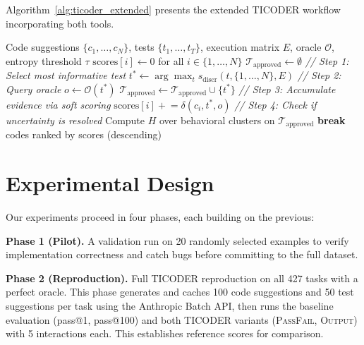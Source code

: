 \documentclass[conference]{IEEEtran}
\begin{document}
Algorithm~\ref{alg:ticoder_extended} presents the extended TICODER workflow incorporating both tools.

\begin{algorithm}[t]
\caption{Extended TICODER: Soft Scoring with Entropy-Based Early Stopping}
\label{alg:ticoder_extended}
\begin{algorithmic}[1]
\Require Code suggestions $\{c_1, \ldots, c_N\}$, tests $\{t_1, \ldots, t_T\}$, execution matrix $E$, oracle $\mathcal{O}$, entropy threshold $\tau$
\State $\text{scores}[i] \gets 0$ for all $i \in \{1, \ldots, N\}$
\State $\mathcal{T}_{\text{approved}} \gets \emptyset$
    \State \textit{// Step 1: Select most informative test}
    \State $t^* \gets \arg\max_{t} s_{\text{discr}}(t, \{1,\ldots,N\}, E)$
    \State \textit{// Step 2: Query oracle}
    \State $o \gets \mathcal{O}(t^*)$
        \State $\mathcal{T}_{\text{approved}} \gets \mathcal{T}_{\text{approved}} \cup \{t^*\}$
    \EndIf
    \State \textit{// Step 3: Accumulate evidence via soft scoring}
        \State $\text{scores}[i] \mathrel{+}= \delta(c_i, t^*, o)$
    \EndFor
    \State \textit{// Step 4: Check if uncertainty is resolved}
    \State Compute $H$ over behavioral clusters on $\mathcal{T}_{\text{approved}}$
        \State \textbf{break} 
    \EndIf
\EndFor
\State \Return codes ranked by scores (descending)
\end{algorithmic}
\end{algorithm}

\section{Experimental Design}

Our experiments proceed in four phases, each building on the previous:

\textbf{Phase 1 (Pilot).} A validation run on 20 randomly selected examples to verify implementation correctness and catch bugs before committing to the full dataset.

\textbf{Phase 2 (Reproduction).} Full TICODER reproduction on all 427 tasks with a perfect oracle. This phase generates and caches 100 code suggestions and 50 test suggestions per task using the Anthropic Batch API, then runs the baseline evaluation (pass@1, pass@100) and both TICODER variants (\textsc{PassFail}, \textsc{Output}) with 5 interactions each. This establishes reference scores for comparison.
\end{document}
